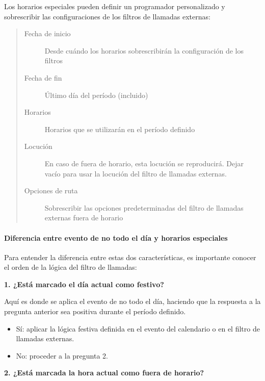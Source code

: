 \documentclass[letterpaper,10pt,spanish]{sphinxmanual}
\begin{document}
Los horarios especiales pueden definir un programador personalizado y sobrescribir las configuraciones de los filtros de llamadas externas:
\begin{quote}
\begin{description}
\item[{Fecha de inicio}] \leavevmode
Desde cuándo los horarios sobrescribirán la configuración de los filtros

\item[{Fecha de fin}] \leavevmode
Último día del período (incluido)

\item[{Horarios}] \leavevmode
Horarios que se utilizarán en el período definido

\item[{Locución}] \leavevmode
En caso de fuera de horario, esta locución se reproducirá. Dejar vacío para usar la locución del filtro de llamadas externas.

\item[{Opciones de ruta}] \leavevmode
Sobrescribir las opciones predeterminadas del filtro de llamadas externas fuera de horario

\end{description}
\end{quote}


\paragraph{Diferencia entre evento de no todo el día y horarios especiales}
\label{administration_portal/client/vpbx/routing_tools/calendars:difference-between-non-whole-day-event-and-special-schedules}
Para entender la diferencia entre estas dos características, es importante conocer el orden de la lógica del filtro de llamadas:

\textbf{1. ¿Está marcado el día actual como festivo?}

Aquí es donde se aplica el evento de no todo el día, haciendo que la respuesta a la pregunta anterior sea positiva durante el período definido.
\begin{itemize}
\item {} 
Sí: aplicar la lógica festiva definida en el evento del calendario o en el filtro de llamadas externas.

\item {} 
No: proceder a la pregunta 2.

\end{itemize}

\textbf{2. ¿Está marcada la hora actual como fuera de horario?}
\end{document}
